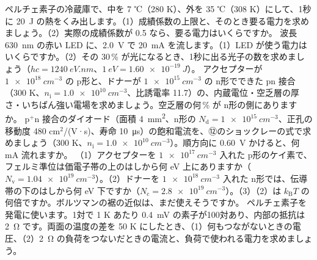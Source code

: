 \bkproblem ペルチェ素子の冷蔵庫で、中を 7 ℃（280 K）、外を 35 ℃（308 K）にして、1秒に \qty{20}{J} の熱をくみ出します。（1）成績係数の上限と、そのとき要る電力を求めましょう。（2）実際の成績係数が 0.5 なら、要る電力はいくらですか。
\bkproblem 波長 \qty{630}{nm} の赤い LED に、\qty{2.0}{V} で \qty{20}{mA} を流します。（1）LED が使う電力はいくらですか。（2）その 30\,\% が光になるとき、1秒に出る光子の数を求めましょう（$hc=\qty{1240}{eV.nm}$、$\qty{1}{eV}=\qty{1.60e-19}{J}$）。
\bkproblem アクセプターが $\qty{1e18}{cm^{-3}}$ の p形と、ドナーが $\qty{1e15}{cm^{-3}}$ の n形でできた pn 接合（300 K、$n_{\mathrm i}=\qty{1.0e10}{cm^{-3}}$、比誘電率 11.7）の、内蔵電位・空乏層の厚さ・いちばん強い電場を求めましょう。空乏層の何\,\% が n形の側にありますか。
\bkproblem p$^+$n 接合のダイオード（面積 \qty{4}{mm^2}、n形の $N_{\mathrm d}=\qty{1e15}{cm^{-3}}$、正孔の移動度 480 cm$^2$/(V·s)、寿命 \qty{10}{\micro s}）の飽和電流を、⑫のショックレーの式で求めましょう（300 K、$n_{\mathrm i}=\qty{1.0e10}{cm^{-3}}$）。順方向に \qty{0.60}{V} かけると、何 mA 流れますか。
\bkproblem （1）アクセプターを $\qty{1e17}{cm^{-3}}$ 入れた p形のケイ素で、フェルミ準位は価電子帯の上のはしから何 eV 上にありますか（$N_{\mathrm v}=\qty{1.04e19}{cm^{-3}}$）。（2）ドナーを $\qty{1e18}{cm^{-3}}$ 入れた n形では、伝導帯の下のはしから何 eV 下ですか（$N_{\mathrm c}=\qty{2.8e19}{cm^{-3}}$）。（3）（2）は $k_{\mathrm B}T$ の何倍ですか。ボルツマンの裾の近似は、まだ使えそうですか。
\bkproblem ペルチェ素子を発電に使います。1対で 1 K あたり \qty{0.4}{mV} の素子が100対あり、内部の抵抗は \qty{2}{\ohm} です。両面の温度の差を 50 K にしたとき、（1）何もつながないときの電圧、（2）\qty{2}{\ohm} の負荷をつないだときの電流と、負荷で使われる電力を求めましょう。

